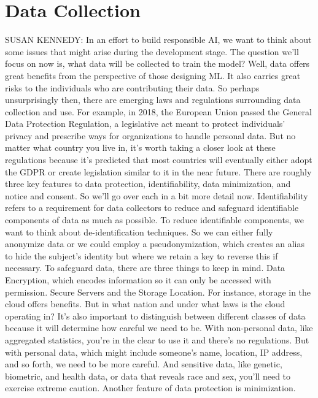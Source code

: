 
\section{Data Collection}

SUSAN KENNEDY: In an effort to build responsible AI,
we want to think about some issues that might arise during the development
stage.
The question we'll focus on now is, what data
will be collected to train the model?
Well, data offers great benefits from the perspective of those designing ML.
It also carries great risks to the individuals
who are contributing their data.
So perhaps unsurprisingly then, there are emerging laws and regulations
surrounding data collection and use.
For example, in 2018, the European Union passed the General Data Protection
Regulation, a legislative act meant to protect individuals' privacy
and prescribe ways for organizations to handle personal data.
But no matter what country you live in, it's
worth taking a closer look at these regulations
because it's predicted that most countries will eventually
either adopt the GDPR or create legislation similar to it
in the near future.
There are roughly three key features to data protection, identifiability, data
minimization, and notice and consent.
So we'll go over each in a bit more detail now.
Identifiability refers to a requirement for data collectors
to reduce and safeguard identifiable components of data as much as possible.
To reduce identifiable components, we want
to think about de-identification techniques.
So we can either fully anonymize data or we
could employ a pseudonymization, which creates
an alias to hide the subject's identity but where we retain
a key to reverse this if necessary.
To safeguard data, there are three things to keep in mind.
Data Encryption, which encodes information
so it can only be accessed with permission.
Secure Servers and the Storage Location.
For instance, storage in the cloud offers benefits.
But in what nation and under what laws is the cloud operating in?
It's also important to distinguish between different classes of data
because it will determine how careful we need to be.
With non-personal data, like aggregated statistics,
you're in the clear to use it and there's no regulations.
But with personal data, which might include someone's name, location,
IP address, and so forth, we need to be more careful.
And sensitive data, like genetic, biometric, and health
data, or data that reveals race and sex, you'll
need to exercise extreme caution.
Another feature of data protection is minimization.
